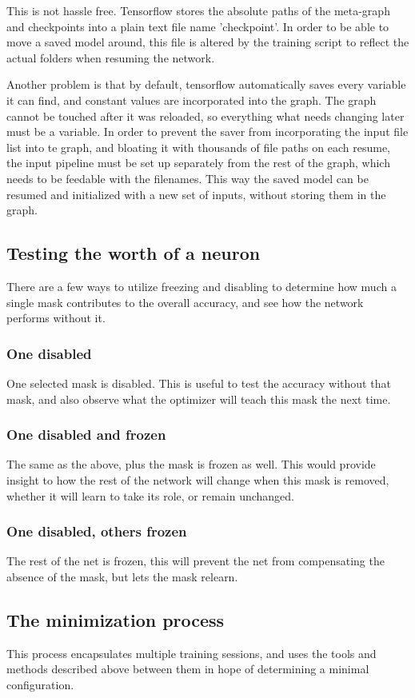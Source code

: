 \documentclass[12pt]{report}
\begin{document}
This is not hassle free. Tensorflow stores the absolute paths of the meta-graph and checkpoints into a plain text file name 'checkpoint'. In order to be able to move a saved model around, this file is altered by the training script to reflect the actual folders when resuming the network.

Another problem is that by default, tensorflow automatically saves every variable it can find, and constant values are incorporated into the graph. The graph cannot be touched after it was reloaded, so everything what needs changing later must be a variable. In order to prevent the saver from incorporating the input file list into te graph, and bloating it with thousands of file paths on each resume, the input pipeline must be set up separately from the rest of the graph, which needs to be feedable with the filenames. This way the saved model can be resumed and initialized with a new set of inputs, without storing them in the graph.
\subsection{Testing the worth of a neuron}
There are a few ways to utilize freezing and disabling to determine how much a single mask contributes to the overall accuracy, and see how the network performs without it.
\subsubsection{One disabled}One selected mask is disabled. This is useful to test the accuracy without that mask, and also observe what the optimizer will teach this mask the next time.
\subsubsection{One disabled and frozen}The same as the above, plus the mask is frozen as well. This would provide insight to how the rest of the network will change when this mask is removed, whether it will learn to take its role, or remain unchanged.
\subsubsection{One disabled, others frozen}The rest of the net is frozen, this will prevent the net from compensating the absence of the mask, but lets the mask relearn.
\subsection{The minimization process}
This process encapsulates multiple training sessions, and uses the tools and methods described above between them in hope of determining a minimal configuration.
\end{document}
